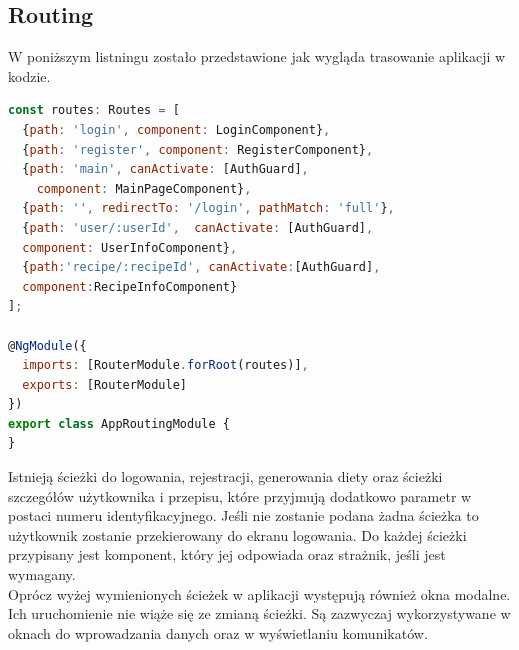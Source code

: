   \subsection{Routing}
  W poniższym listningu zostało przedstawione jak wygląda trasowanie aplikacji w kodzie.
  \begin{lstlisting}[language=JavaScript] 
const routes: Routes = [
  {path: 'login', component: LoginComponent},
  {path: 'register', component: RegisterComponent},
  {path: 'main', canActivate: [AuthGuard],
    component: MainPageComponent},
  {path: '', redirectTo: '/login', pathMatch: 'full'},
  {path: 'user/:userId',  canActivate: [AuthGuard],
  component: UserInfoComponent},
  {path:'recipe/:recipeId', canActivate:[AuthGuard],
  component:RecipeInfoComponent}
];

@NgModule({
  imports: [RouterModule.forRoot(routes)],
  exports: [RouterModule]
})
export class AppRoutingModule {
}
  \end{lstlisting}
  Istnieją ścieżki do logowania, rejestracji, generowania diety oraz ścieżki szczegółów użytkownika i przepisu, które przyjmują dodatkowo parametr w postaci numeru identyfikacyjnego. Jeśli nie zostanie podana żadna ścieżka to użytkownik zostanie przekierowany do ekranu logowania. Do każdej ścieżki przypisany jest komponent, który jej odpowiada oraz strażnik, jeśli jest wymagany.\\ 
  Oprócz wyżej wymienionych ścieżek w aplikacji występują również okna modalne. Ich uruchomienie nie wiąże się ze zmianą ścieżki. Są zazwyczaj wykorzystywane w oknach do wprowadzania danych oraz w wyświetlaniu komunikatów.